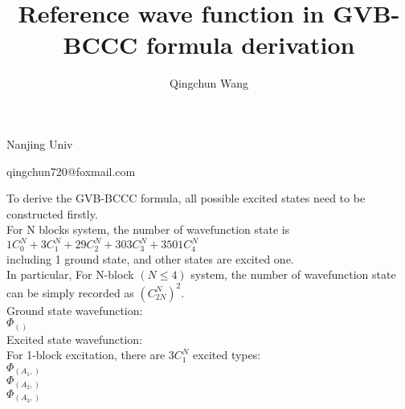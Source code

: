 \documentclass[14pt]{article}
\begin{document}
    \title{Reference wave function in GVB-BCCC formula derivation}
    \author{Qingchun Wang}
    \maketitle
    \centerline{Nanjing Univ}
    \centerline{qingchun720@foxmail.com}
    
    \linespread{2.0}\selectfont
    \thispagestyle{empty}
    
    \newpage
    \setlength{\parindent}{0pt}
    \setcounter{page}{1}
    
    To derive the GVB-BCCC formula, all possible excited states need to be constructed firstly. \\ 
    For N blocks system, the number of wavefunction state is \\ 
    $1C^N_0+3C^N_1+29C^N_2+303C^N_3+3501C^N_4  $ \\ 
    including 1 ground state, and other states are excited one. \\ 
    In particular, For N-block $(N\le4 )$ system, the number of wavefunction state can be simply recorded as $ (C^N_{2N})^2 $. \\ 
    
    Ground state wavefunction: \\ 
    $\Phi_{()}$ \\ 
    
    Excited state wavefunction: \\ 
    For 1-block excitation, there are $ 3C^N_1 $ excited types: \\ 
    $\Phi_{({A}_{1},)}$ \\ 
    $\Phi_{({A}_{2},)}$ \\ 
    $\Phi_{({A}_{3},)}$ \\ 
    
\end{document}
